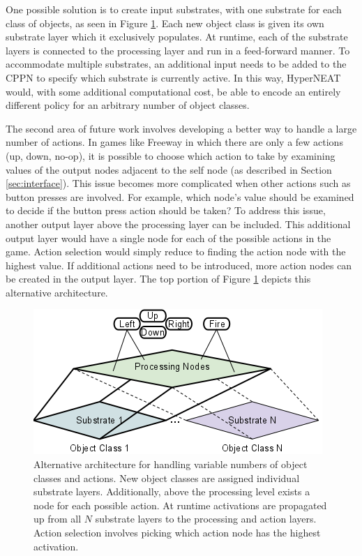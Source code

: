 \documentclass{acm_proc_article-sp}
\begin{document}
One possible solution is to create input substrates, with one substrate for each class of objects, as seen in Figure \ref{fig:possiblearch}. Each new object class is given its own substrate layer which it exclusively populates. At runtime, each of the substrate layers is connected to the processing layer and run in a feed-forward manner. To accommodate multiple substrates, an additional input needs to be added to the CPPN to specify which substrate is currently active. In this way, HyperNEAT would, with some additional computational cost, be able to encode an entirely different policy for an arbitrary number of object classes. 

The second area of future work involves developing a better way to handle a large number of actions. In games like Freeway in which there are only a few actions (up, down, no-op), it is possible to choose which action to take by examining values of the output nodes adjacent to the self node (as described in Section \ref{sec:interface}). This issue becomes more complicated when other actions such as button presses are involved. For example, which node's value should be examined to decide if the button press action should be taken? To address this issue, another output layer above the processing layer can be included. This additional output layer would have a single node for each of the possible actions in the game. Action selection would simply reduce to finding the action node with the highest value. If additional actions need to be introduced, more action nodes can be created in the output layer. The top portion of Figure \ref{fig:possiblearch} depicts this alternative architecture.

\begin{figure}[htp]
\begin{center}
\includegraphics[width=\columnwidth]{figures/multiple-substrate.png}
\end{center}
\caption{Alternative architecture for handling variable numbers of object classes and actions. New object classes are assigned individual substrate layers. Additionally, above the processing level exists a node for each possible action. At runtime activations are propagated up from all $N$ substrate layers to the processing and action layers. Action selection involves picking which action node has the highest activation.}
\label{fig:possiblearch}
\end{figure}
\end{document}
